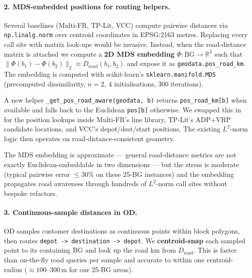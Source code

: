 \paragraph{2. MDS-embedded positions for routing helpers.}
Several baselines (Multi-FR, TP-Lit, VCC) compute pairwise
distances via \verb|np.linalg.norm| over centroid coordinates
in EPSG:2163 metres. Replacing every call site with matrix
look-ups would be invasive. Instead, when the road-distance matrix
is attached we compute a \textbf{2D MDS embedding}
$\Phi : \mathrm{BG} \to \mathbb{R}^2$ such that
$\| \Phi(b_1) - \Phi(b_2) \|_2 \approx D_{\mathrm{road}}(b_1, b_2)$
and expose it as \verb|geodata.pos_road_km|. The embedding is
computed with scikit-learn's \verb|sklearn.manifold.MDS|
(precomputed dissimilarity, $n=2$, $4$ initialisations,
$300$ iterations).

A new helper \verb|_get_pos_road_aware(geodata, b)| returns
\verb|pos_road_km[b]| when available and falls back to the
Euclidean \verb|pos[b]| otherwise. We swapped this in for the
position lookups inside Multi-FR's line library, TP-Lit's ADP+VRP
candidate locations, and VCC's depot/dest/start positions. The
existing $L^2$-norm logic then operates on road-distance-consistent
geometry.

The MDS embedding is approximate --- general road-distance metrics
are not exactly Euclidean-embeddable in two dimensions --- but the
stress is moderate (typical pairwise error $\le 30\%$ on these 25-BG
instances) and the embedding propagates road awareness through
hundreds of $L^2$-norm call sites without bespoke refactors.

\paragraph{3. Continuous-sample distances in OD.}
OD samples customer destinations as continuous points within block
polygons, then routes \verb|depot -> destination -> depot|. We
\textbf{centroid-snap} each sampled point to its containing BG and
look up the road km from $D_{\mathrm{road}}$. This is faster than
on-the-fly road queries per sample and accurate to within one
centroid-radius ($\approx 100$--$300$\,m for our 25-BG areas).

